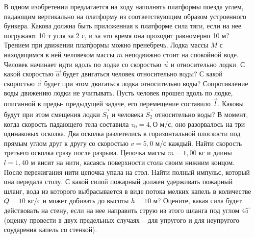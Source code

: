 \AddProb В одном изобретении предлагается на ходу наполнять платформы поезда углем, падающим вертикально на платформу из соответствующим образом устроенного бункера. Какова должна быть приложенная к платформе сила тяги, если на нее погружают 10 т угля
за 2 с, и за это время она проходит равномерно 10 м? Трением при
движении платформы можно пренебречь.
\AddProb Лодка массы $M$ с находящимся в ней человеком массы $m$ неподвижно стоит на спокойной воде. Человек начинает идти вдоль
по лодке со скоростью $\vec{u}$ и относительно лодки. С какой скоростью $\vec{w}$ будет двигаться человек относительно воды? С какой скоростью $\vec{v}$ будет при этом двигаться лодка относительно воды? Сопротивление воды движению лодки не учитывать.
\AddProb Пусть человек прошел вдоль по лодке, описанной в преды-
предыдущей задаче, его перемещение составило $\vec{l}$. Каковы будут при этом смещения лодки $\vec{S_1}$ и человека $\vec{S_2}$ относительно воды?
\AddProb В момент, когда скорость падающего тела составила $v_0 = 4,О$ м/с, оно разорвалось на три одинаковых осколка. Два осколка разлетелись в горизонтальной плоскости под прямым углом друг к другу со скоростью $v = 5,0$ м/с каждый. Найти скорость третьего осколка сразу после разрыва.
\AddProb Цепочка массы $m = 1,00$ кг и длины $l = 1,40$ м висит на нити, касаясь поверхности стола своим нижним концом. После пережигания нити цепочка упала на стол. Найти полный импульс, который она передала столу.
\AddProb С какой силой пожарный должен удерживать пожарный шланг, вода из которого выбрасывается в виде потока мелких капель в количестве $Q = 10$ кг/с и может добивать до высоты $h = 10$ м? Оцените, какая сила будет действовать на стену, если на нее направить струю из этого шланга под углом $45^{\circ}$ (оценку провести в двух предельных случаях -- для упругого и для неупругого соударения капель со стенкой).
\clearpage